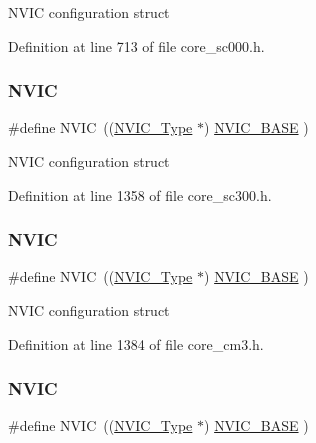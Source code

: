 N\+V\+IC configuration struct 

Definition at line 713 of file core\+\_\+sc000.\+h.

\mbox{\label{group___c_m_s_i_s__core__base_gac8e97e8ce56ae9f57da1363a937f8a17}} 
\subsubsection{\texorpdfstring{N\+V\+IC}{NVIC}\hspace{0.1cm}{\footnotesize\ttfamily [4/7]}}
{\footnotesize\ttfamily \#define N\+V\+IC~((\hyperlink{struct_n_v_i_c___type}{N\+V\+I\+C\+\_\+\+Type}      $\ast$)     \hyperlink{group___c_m_s_i_s__core__base_gaa0288691785a5f868238e0468b39523d}{N\+V\+I\+C\+\_\+\+B\+A\+SE}     )}

N\+V\+IC configuration struct 

Definition at line 1358 of file core\+\_\+sc300.\+h.

\mbox{\label{group___c_m_s_i_s__core__base_gac8e97e8ce56ae9f57da1363a937f8a17}} 
\subsubsection{\texorpdfstring{N\+V\+IC}{NVIC}\hspace{0.1cm}{\footnotesize\ttfamily [5/7]}}
{\footnotesize\ttfamily \#define N\+V\+IC~((\hyperlink{struct_n_v_i_c___type}{N\+V\+I\+C\+\_\+\+Type}      $\ast$)     \hyperlink{group___c_m_s_i_s__core__base_gaa0288691785a5f868238e0468b39523d}{N\+V\+I\+C\+\_\+\+B\+A\+SE}     )}

N\+V\+IC configuration struct 

Definition at line 1384 of file core\+\_\+cm3.\+h.

\mbox{\label{group___c_m_s_i_s__core__base_gac8e97e8ce56ae9f57da1363a937f8a17}} 
\subsubsection{\texorpdfstring{N\+V\+IC}{NVIC}\hspace{0.1cm}{\footnotesize\ttfamily [6/7]}}
{\footnotesize\ttfamily \#define N\+V\+IC~((\hyperlink{struct_n_v_i_c___type}{N\+V\+I\+C\+\_\+\+Type}      $\ast$)     \hyperlink{group___c_m_s_i_s__core__base_gaa0288691785a5f868238e0468b39523d}{N\+V\+I\+C\+\_\+\+B\+A\+SE}     )}


